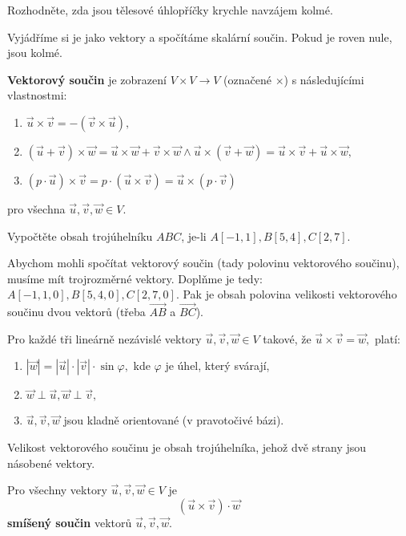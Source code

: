 \begin{priklad}
Rozhodněte, zda jsou tělesové úhlopříčky krychle navzájem kolmé.
\end{priklad}

\begin{reseni}
Vyjádříme si je jako vektory a spočítáme skalární součin. Pokud je roven nule, jsou kolmé.
\end{reseni}

\begin{definition}
\textbf{Vektorový součin} je zobrazení $V\times V\to  V$ (označené $\times$) s následujícími vlastnostmi:
\begin{enumerate}[$i.$]
\item $\vec u\times \vec v = -(\vec v \times \vec u),$
\item $(\vec u + \vec v)\times \vec w = \vec u \times \vec w + \vec v \times \vec w \land \vec u\times (\vec v + \vec w) = \vec u \times \vec v+\vec u\times \vec w,$
\item $(p\cdot \vec u)\times \vec v = p\cdot(\vec u \times \vec v) = \vec u \times (p\cdot \vec v)$
\end{enumerate}
pro všechna $\vec u, \vec v, \vec w \in V.$
\end{definition}

\begin{priklad}
Vypočtěte obsah trojúhelníku $ABC$, je-li $A[-1,1], B[5,4], C[2,7].$
\end{priklad}

\begin{reseni}
Abychom mohli spočítat vektorový součin (tady polovinu vektorového součinu), musíme
mít trojrozměrné vektory. Doplňme je tedy: $A[-1,1, 0], B[5,4, 0], C[2,7,0].$ Pak
je obsah polovina velikosti vektorového součinu dvou vektorů (třeba $\overrightarrow{AB}$ a $\overrightarrow{BC}$).
\end{reseni}

\begin{veta}
    Pro každé tři lineárně nezávislé vektory $\vec u, \vec v, \vec w \in V$ takové,
   že $\vec u\times \vec v = \vec w,$ platí:
   \begin{enumerate}[$i.$]
   \item $|\vec w| = |\vec u|\cdot |\vec v|\cdot \sin \varphi,$ kde $\varphi$ je úhel, který svárají,
  	\item $\vec w\perp \vec u, \vec w \perp \vec v,$
  	\item $\vec u, \vec v, \vec w$ jsou kladně orientované (v pravotočivé bázi).
   \end{enumerate}
\end{veta}

\begin{pozn}
    Velikost vektorového součinu je obsah trojúhelníka, jehož dvě strany jsou
    násobené vektory.
\end{pozn}

\begin{definition}
    Pro všechny vektory $\vec u, \vec v, \vec w \in V$ je
    $$(\vec u \times \vec v) \cdot \vec w$$
    \textbf{smíšený součin} vektorů $\vec u, \vec v, \vec w.$
\end{definition}
